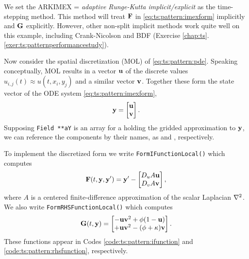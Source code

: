 We set the ARKIMEX = \emph{adaptive Runge-Kutta implicit/explicit} \citep{AscherRuuthSpiteri1997} as the time-stepping method.  This method will treat $\mathbf{F}$ in \eqref{eq:ts:pattern:imexform} implicitly and $\mathbf{G}$ explicitly.  However, other non-split implicit methods work quite well on this example, including Crank-Nicolson and BDF (Exercise \ref{chap:ts}.\ref{exer:ts:patternperformancestudy}).

Now consider the spatial discretization (MOL) of \eqref{eq:ts:pattern:pde}.  Speaking conceptually, MOL results in a vector $\mathbf{u}$ of the discrete values $u_{i,j}(t) \approx u(t,x_i,y_j)$ and a similar vector $\mathbf{v}$.  Together these form the state vector of the ODE system \eqref{eq:ts:pattern:imexform}, 
\begin{equation}
\mathbf{y} = \begin{bmatrix} \mathbf{u} \\ \mathbf{v} \end{bmatrix}.  \label{eq:ts:pattern:blockvars}
\end{equation}
Supposing \texttt{Field **aY} is an array for a \pVec holding the gridded approximation to $\mathbf{y}$, we can reference the components by their names, as  and , respectively.


To implement the discretized form we write \texttt{FormIFunctionLocal()} which computes
\begin{equation}
\mathbf{F}(t,\mathbf{y},\mathbf{y}') = \mathbf{y}' - \begin{bmatrix} D_u A \mathbf{u} \\ D_v A \mathbf{v} \end{bmatrix},  \label{eq:ts:pattern:blockifunction}
\end{equation}
where $A$ is a centered finite-difference approximation of the scalar Laplacian $\nabla^2$.  We also write \texttt{FormRHSFunctionLocal()} which computes
\begin{equation}
\mathbf{G}(t,\mathbf{y}) = \begin{bmatrix}
- \mathbf{u} \mathbf{v}^2 + \phi (1-\mathbf{u}) \\
+ \mathbf{u} \mathbf{v}^2 - (\phi + \kappa) \mathbf{v}
\end{bmatrix}. \label{eq:ts:pattern:blockrhsfunction}
\end{equation}
These functions appear in Codes \ref{code:ts:pattern:ifunction} and \ref{code:ts:pattern:rhsfunction}, respectively.

